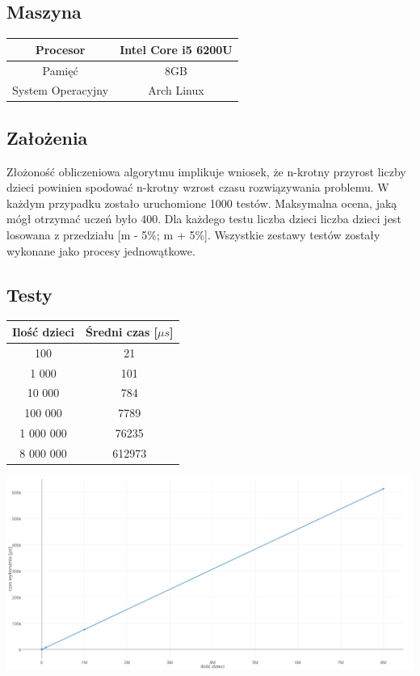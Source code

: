 \documentclass{article}
\begin{document}
	\subsection{Maszyna}
	\begin{center}
		\begin{tabular}{c c}
			\toprule
			Procesor & Intel Core i5 6200U \\
			\midrule
			Pamięć & 8GB \\
			\midrule
			System Operacyjny & Arch Linux\\
			\bottomrule
		\end{tabular}
	\end{center}

	\subsection{Założenia}
	Złożoność obliczeniowa algorytmu implikuje wniosek, że n-krotny przyrost liczby dzieci powinien spodować n-krotny wzrost czasu rozwiązywania problemu.
	W każdym przypadku zostało uruchomione 1000 testów. Maksymalna ocena, jaką mógł otrzymać uczeń było 400.
	Dla każdego testu liczba dzieci liczba dzieci jest losowana z przedziału [m - 5\%; m + 5\%].
	Wszystkie zestawy testów zostały wykonane jako procesy jednowątkowe.


	\subsection{Testy}

	\begin{center}
		\begin{tabular}{c c}
			\toprule
				Ilość dzieci & Średni czas [$\mu s$] \\
			\midrule
				100 & 21 \\
				1 000 & 101 \\
				10 000 & 784 \\
				100 000 & 7789 \\
				1 000 000 & 76235 \\
				8 000 000 & 612973 \\
			\bottomrule
		\end{tabular}

		\vspace{3cm}
		\includegraphics[width=\textwidth]{test_plot.png}
	\end{center}
\end{document}
